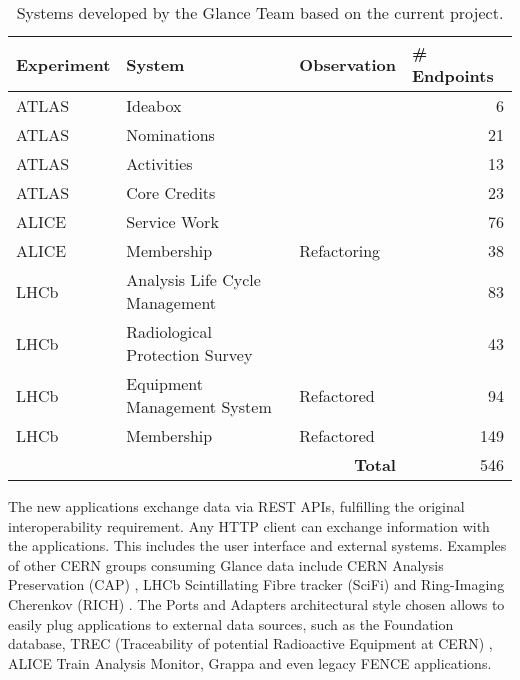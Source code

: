 \begin{table}[htbp]
\begin{tabular}{ll|l|r|}
\hline
\multicolumn{1}{|l|}{Experiment} & System & Observation & \multicolumn{1}{l|}{\# Endpoints} \\
\hline
\multicolumn{1}{|l|}{ATLAS}      & Ideabox \cite{oliveira-tcc}    &             & 6   \\
\multicolumn{1}{|l|}{ATLAS}      & Nominations \cite{oliveira-tcc} &             & 21  \\
\multicolumn{1}{|l|}{ATLAS}      & Activities                     &             & 13  \\
\multicolumn{1}{|l|}{ATLAS}      & Core Credits \cite{pires-tcc}  &             & 23  \\
\multicolumn{1}{|l|}{ALICE}      & Service Work                   &             & 76  \\
\multicolumn{1}{|l|}{ALICE}      & Membership                     & Refactoring & 38  \\
\multicolumn{1}{|l|}{LHCb}       & Analysis Life Cycle Management &             & 83  \\
\multicolumn{1}{|l|}{LHCb}       & Radiological Protection Survey &             & 43  \\
\multicolumn{1}{|l|}{LHCb}       & Equipment Management System \cite{de-jesus-tcc} & Refactored  & 94  \\
\multicolumn{1}{|l|}{LHCb}       & Membership                     & Refactored  & 149 \\
\hline
                                 &                                & \multicolumn{1}{r|}{\textbf{Total}} & 546 \\
\cline{3-4}
\end{tabular}
\caption{Systems developed by the Glance Team based on the current project.}
\label{table:new-apps}
\end{table}

The new applications exchange data via REST APIs, fulfilling the original interoperability requirement. Any HTTP client can exchange information with the applications. This includes the user interface and external systems. Examples of other CERN groups consuming Glance data include CERN Analysis Preservation (CAP) \cite{cap-website}, LHCb Scintillating Fibre tracker (SciFi) \cite{lhcb-scifi} and Ring-Imaging Cherenkov (RICH) \cite{lhcb-rich}. The Ports and Adapters architectural style chosen allows to easily plug applications to external data sources, such as the Foundation database, TREC (Traceability of potential Radioactive Equipment at CERN) \cite{eam-trec-website}, ALICE Train Analysis Monitor, Grappa \cite{grappa-website} and even legacy FENCE applications.

